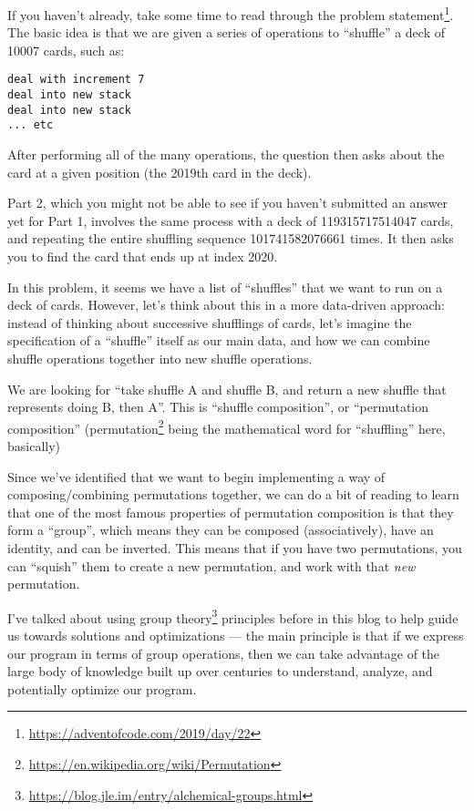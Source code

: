 \documentclass[]{article}
\renewcommand{\href}[2]{#2\footnote{\url{#1}}}
\begin{document}
If you haven't already, take some time to
\href{https://adventofcode.com/2019/day/22}{read through the problem statement}.
The basic idea is that we are given a series of operations to ``shuffle'' a deck
of 10007 cards, such as:

\begin{verbatim}
deal with increment 7
deal into new stack
deal into new stack
... etc
\end{verbatim}

After performing all of the many operations, the question then asks about the
card at a given position (the 2019th card in the deck).

Part 2, which you might not be able to see if you haven't submitted an answer
yet for Part 1, involves the same process with a deck of 119315717514047 cards,
and repeating the entire shuffling sequence 101741582076661 times. It then asks
you to find the card that ends up at index 2020.

In this problem, it seems we have a list of ``shuffles'' that we want to run on
a deck of cards. However, let's think about this in a more data-driven approach:
instead of thinking about successive shufflings of cards, let's imagine the
specification of a ``shuffle'' itself as our main data, and how we can combine
shuffle operations together into new shuffle operations.

We are looking for ``take shuffle A and shuffle B, and return a new shuffle that
represents doing B, then A''. This is ``shuffle composition'', or ``permutation
composition'' (\href{https://en.wikipedia.org/wiki/Permutation}{permutation}
being the mathematical word for ``shuffling'' here, basically)

Since we've identified that we want to begin implementing a way of
composing/combining permutations together, we can do a bit of reading to learn
that one of the most famous properties of permutation composition is that they
form a ``group'', which means they can be composed (associatively), have an
identity, and can be inverted. This means that if you have two permutations, you
can ``squish'' them to create a new permutation, and work with that \emph{new}
permutation.

I've talked about \href{https://blog.jle.im/entry/alchemical-groups.html}{using
group theory} principles before in this blog to help guide us towards solutions
and optimizations --- the main principle is that if we express our program in
terms of group operations, then we can take advantage of the large body of
knowledge built up over centuries to understand, analyze, and potentially
optimize our program.
\end{document}
